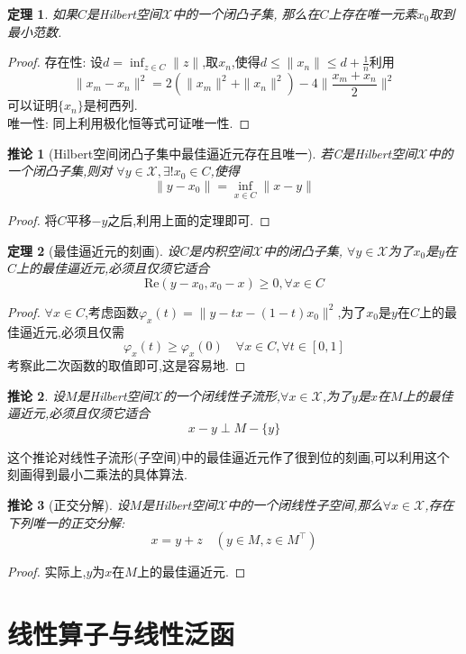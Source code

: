 \documentclass[12pt,a4paper]{article}
\newtheorem{thm}{定理}[subsection]  %
\newtheorem{corollary}{推论}[subsection] %
\begin{document}
\begin{thm}
    如果$C$是\rm{Hilbert}空间$\mathscr{X}$中的一个闭凸子集,
    那么在$C$上存在唯一元素$x_0$取到最小范数.
\end{thm}
\begin{proof}
    存在性: 设$d= \inf_{z \in C}\|z\|$,取$x_n$,使得$d\leq \|x_n\|\leq d + \frac{1}{n}$利用
    \[\|x_m - x_n\|^2 = 2(\|x_m\|^2+\|x_n\|^2)-4\|\frac{x_m + x_n}{2}\|^2\]
    可以证明$\{x_n\}$是柯西列.\\
    唯一性: 同上利用极化恒等式可证唯一性.
\end{proof}
\begin{corollary}[\rm{Hilbert}空间闭凸子集中最佳逼近元存在且唯一]
    若C是\rm{Hilbert}空间$\mathscr{X}$中的一个闭凸子集,则对
    $\forall y \in \mathscr{X},\exists !x_0 \in C$,使得\[\|y-x_0\| = \inf_{x\in C}\|x-y\|\]
\end{corollary}
\begin{proof}
    将$C$平移$-y$之后,利用上面的定理即可.
\end{proof}
\begin{thm}[最佳逼近元的刻画]
    设$C$是内积空间$\mathscr{X}$中的闭凸子集, $\forall y \in \mathscr{X}$为了$x_0$是$y$在$C$上的最佳逼近元,必须且仅须它适合
    \[\mathrm{Re}(y-x_0,x_0-x)\geq 0,\forall x \in C\]
\end{thm}
\begin{proof}
    $\forall x \in C$,考虑函数$\varphi_x(t) = \|y-tx-(1-t)x_0\|^2$,为了$x_0$是$y$在$C$上的最佳逼近元,必须且仅需
    \[\varphi_x(t)\geq\varphi_x(0) \quad \forall x \in C ,\forall t \in[0,1]\]
    考察此二次函数的取值即可,这是容易地.
\end{proof}
\begin{corollary}
    设$M$是\rm{Hilbert}空间$\mathscr{X}$的一个闭线性子流形,$\forall x \in \mathscr{X}$,为了$y$是$x$在$M$上的最佳逼近元,必须且仅须它适合
    \[x-y \perp M-\{y\} \]
\end{corollary}
这个推论对线性子流形(子空间)中的最佳逼近元作了很到位的刻画,可以利用这个刻画得到最小二乘法的具体算法.
\begin{corollary}[正交分解]
    设$M$是\rm{Hilbert}空间$\mathscr{X}$中的一个闭线性子空间,那么$\forall x \in \mathscr{X}$,存在下列唯一的正交分解:
    \[x= y+z\quad (y\in M,z\in M^{\top})\]
\end{corollary}
\begin{proof}
    实际上,$y$为$x$在$M$上的最佳逼近元.
\end{proof}

\newpage
\section{线性算子与线性泛函}
\end{document}
